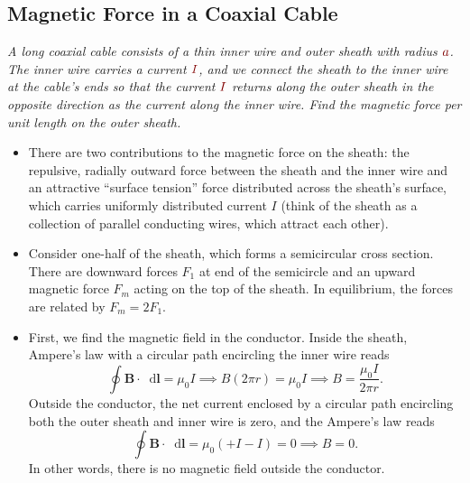 \documentclass[11pt, a4paper]{article}
\newcommand{\diff}{\mathop{}\!\mathrm{d}} %
\newcommand{\dmath}[1]{\textcolor{Maroon}{#1}}  %
\renewcommand{\vec}[1]{\bm{#1}} %
\begin{document}
\subsection{Magnetic Force in a Coaxial Cable}
\textit{A long coaxial cable consists of a thin inner wire and outer sheath with radius $ \dmath{a} $. The inner wire carries a current $ \dmath{I} $, and we connect the sheath to the inner wire at the cable's ends so that the current $ \dmath{I} $ returns along the outer sheath in the opposite direction as the current along the inner wire. Find the magnetic force per unit length on the outer sheath.}

\begin{itemize}
	\item There are two contributions to the magnetic force on the sheath: the repulsive, radially outward force between the sheath and the inner wire and an attractive ``surface tension'' force distributed across the sheath's surface, which carries uniformly distributed current $ I $ (think of the sheath as a collection of parallel conducting wires, which attract each other).
	
	\item Consider one-half of the sheath, which forms a semicircular cross section. There are downward forces $ F_{1} $ at end of the semicircle and an upward magnetic force $ F_{m} $ acting on the top of the sheath. In equilibrium, the forces are related by $ F_{m} = 2F_{1} $.
	
	\item First, we find the magnetic field in the conductor. Inside the sheath, Ampere's law with a circular path encircling the inner wire reads
	\begin{equation*}
		\oint \vec{B} \cdot \diff \bm{l} = \mu_{0} I \implies B (2\pi r) = \mu_{0}I \implies B = \frac{\mu_{0}I}{2\pi r}.
	\end{equation*}
	Outside the conductor, the net current enclosed by a circular path encircling both the outer sheath and inner wire is zero, and the Ampere's law reads
	\begin{equation*}
		\oint \vec{B} \cdot \diff \bm{l} = \mu_{0} (+I - I) = 0 \implies B = 0.
	\end{equation*}
	In other words, there is no magnetic field outside the conductor.
	

\end{itemize}
\end{document}
